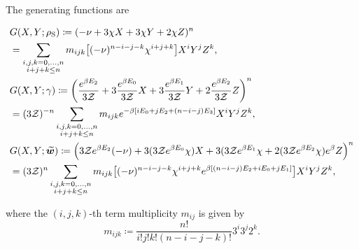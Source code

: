 \documentclass[pra,
aps,
twocolumn,
superscriptaddress,
groupedaddress,
nofootinbib,
reprint
]{revtex4-1}
\begin{document}
The generating functions are
\begin{widetext}
\begin{align}
	&G(X,Y; \rho_{\rm{S}}) \coloneqq (-\nu + 3\chi X + 3\chi Y + 2\chi Z)^n \nonumber\\
	&= \sum\limits_{\substack{i,j,k = 0,\dots,n \\ i+j+k \leq n}} m_{ijk} \big[(-\nu)^{n-i-j-k} \chi^{i+j+k} \big] X^i Y^j Z^k, \\
	&G(X,Y; \gamma) \coloneqq \left( \frac{e^{\beta E_2}}{3\mathcal{Z}} + 3\frac{e^{\beta E_0}}{3\mathcal{Z}} X + 3\frac{e^{\beta E_1}}{3\mathcal{Z}} Y + 2\frac{e^{\beta E_2}}{3\mathcal{Z}} Z \right)^n \nonumber\\
	&= (3\mathcal{Z})^{-n}\sum\limits_{\substack{i,j,k = 0,\dots,n \\ i+j+k \leq n}} m_{ijk} e^{-\beta [ i E_0 + j E_2 + (n-i-j) E_3 ]} X^i Y^j Z^k, \\
	&G(X,Y; \widetilde{\bm{w}}) \coloneqq \Big( 3\mathcal{Z} e^{\beta E_2}(-\nu) + 3(3\mathcal{Z} e^{\beta E_0}\chi) X + 3(3\mathcal{Z} e^{\beta E_1}\chi + 2(3\mathcal{Z} e^{\beta E_2}\chi) e^\beta Z \Big)^n \nonumber\\
	&= (3\mathcal{Z})^n \sum\limits_{\substack{i,j,k = 0,\dots,n \\ i+j+k \leq n}} m_{ijk} \big[(-\nu)^{n-i-j-k} \chi^{i+j+k} e^{\beta [(n-i-j)E_2 + iE_0 + jE_1]} \big] X^i Y^j Z^k,
\end{align}
\end{widetext}
where the $(i,j,k)$-th term multiplicity $m_{ij}$ is given by
\begin{equation}
	m_{ijk} \coloneqq \frac{n!}{i!j!k!(n-i-j-k)!} 3^i 3^j 2^k.
\end{equation}
\end{document}
